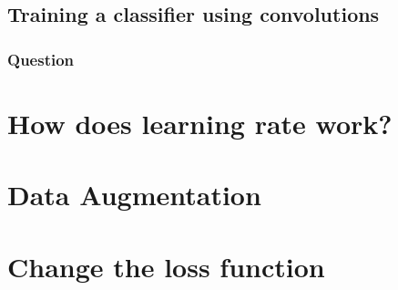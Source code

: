 \documentclass[12pt]{article}
\begin{document}
\subsection{Training a classifier using convolutions}
\subsubsection{Question}

\section{How does learning rate work?}

\section{Data Augmentation}

\section{Change the loss function}
\end{document}
